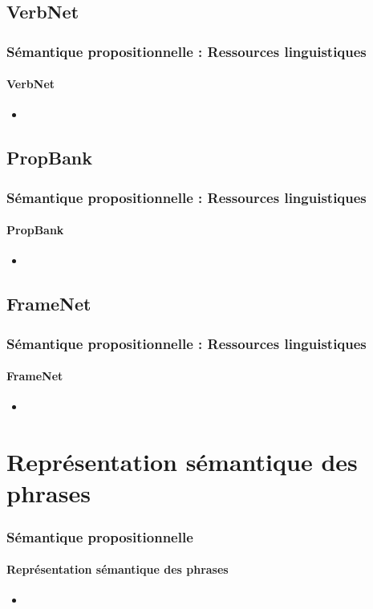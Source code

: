 \documentclass[xcolor=table]{beamer}
\begin{document}
\subsection{VerbNet}

\begin{frame}
	\frametitle{Sémantique propositionnelle : Ressources linguistiques}
	\framesubtitle{VerbNet}
	
	\begin{itemize}
		\item 
	\end{itemize}
	
\end{frame}

\subsection{PropBank}

\begin{frame}
	\frametitle{Sémantique propositionnelle : Ressources linguistiques}
	\framesubtitle{PropBank}
	
	\begin{itemize}
		\item 
	\end{itemize}
	
\end{frame}

\subsection{FrameNet}

\begin{frame}
	\frametitle{Sémantique propositionnelle : Ressources linguistiques}
	\framesubtitle{FrameNet}
	
	\begin{itemize}
		\item 
	\end{itemize}
	
\end{frame}


\section{Représentation sémantique des phrases}

\begin{frame}
	\frametitle{Sémantique propositionnelle}
	\framesubtitle{Représentation sémantique des phrases}
	
	\begin{itemize}
		\item 
	\end{itemize}
	
\end{frame}
\end{document}
